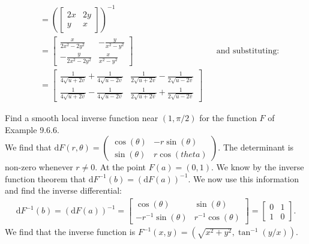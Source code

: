 \documentclass[12pt]{book}
\newenvironment{exercise}[2][Exercise]{\begin{trivlist}
\item[\hskip \labelsep {\bfseries #1}\hskip \labelsep {\bfseries #2.}]}{\end{trivlist}}
\begin{document}
\begin{exercise}{9.6.2}
\begin{align*}
                            &= \left( \begin{bmatrix} 2x & 2y \\ y  & x \end{bmatrix}  \right)^{-1} \\
                            &= \left[\begin{matrix}\frac{x}{2 x^{2} - 2 y^{2}} & - \frac{y}{x^{2} - y^{2}}\\- \frac{y}{2 x^{2} - 2 y^{2}} & \frac{x}{x^{2} - y^{2}}\end{matrix}\right] && \text{and substituting:} \\
                            &= \left[\begin{matrix}\frac{1}{4 \sqrt{u + 2 v}} + \frac{1}{4 \sqrt{u - 2 v}} & \frac{1}{2 \sqrt{u + 2 v}} - \frac{1}{2 \sqrt{u - 2 v}}\\\frac{1}{4 \sqrt{u + 2 v}} - \frac{1}{4 \sqrt{u - 2 v}} & \frac{1}{2 \sqrt{u + 2 v}} + \frac{1}{2 \sqrt{u - 2 v}}\end{matrix}\right]
    \end{align*}
\end{exercise}




\begin{exercise}{9.6.5}
    Find a smooth local inverse function near $(1, \pi/2)$ for the function $F$ of Example 9.6.6.  \\
    
We find that $\text{d} F(r, \theta)= \begin{pmatrix} \cos(\theta) & -r \sin(\theta) \\ \sin(\theta) & r \cos(theta) \end{pmatrix}$. The determinant is non-zero whenever $r\neq 0$. At the point $F(a)=(0,1)$. We know by the inverse function theorem that $\text{d} F^{-1} (b) = \left( \text{d} F(a) \right)^{-1}$. We now use this information and find the inverse differential:
    \begin{align*}
    \text{d} F^{-1}(b) = \left( \text{d} F(a)\right)^{-1} = \begin{bmatrix} \cos(\theta) & \sin(\theta) \\ -r^{-1} \sin(\theta) & r^{-1} \cos(\theta) \end{bmatrix} = \begin{bmatrix} 0 & 1 \\ 1 & 0 \end{bmatrix}.
    \end{align*}
    We find that the inverse function is $F^{-1}(x,y) = \left( \sqrt{x^2 + y^2}, \tan^{-1}(y/x)\right)$. 
\end{exercise}
\end{document}
